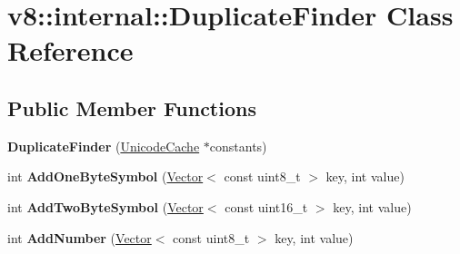 \hypertarget{classv8_1_1internal_1_1_duplicate_finder}{}\section{v8\+:\+:internal\+:\+:Duplicate\+Finder Class Reference}
\label{classv8_1_1internal_1_1_duplicate_finder}
\subsection*{Public Member Functions}
\begin{DoxyCompactItemize}
\item 
{\bfseries Duplicate\+Finder} (\hyperlink{classv8_1_1internal_1_1_unicode_cache}{Unicode\+Cache} $\ast$constants)\hypertarget{classv8_1_1internal_1_1_duplicate_finder_a927b48956e82ff809b782a602987d4e3}{}\label{classv8_1_1internal_1_1_duplicate_finder_a927b48956e82ff809b782a602987d4e3}

\item 
int {\bfseries Add\+One\+Byte\+Symbol} (\hyperlink{classv8_1_1internal_1_1_vector}{Vector}$<$ const uint8\+\_\+t $>$ key, int value)\hypertarget{classv8_1_1internal_1_1_duplicate_finder_a347c1166134c068ac1239f54a452c4fe}{}\label{classv8_1_1internal_1_1_duplicate_finder_a347c1166134c068ac1239f54a452c4fe}

\item 
int {\bfseries Add\+Two\+Byte\+Symbol} (\hyperlink{classv8_1_1internal_1_1_vector}{Vector}$<$ const uint16\+\_\+t $>$ key, int value)\hypertarget{classv8_1_1internal_1_1_duplicate_finder_a1b859971d4bdf0574b7e2b312eb1a764}{}\label{classv8_1_1internal_1_1_duplicate_finder_a1b859971d4bdf0574b7e2b312eb1a764}

\item 
int {\bfseries Add\+Number} (\hyperlink{classv8_1_1internal_1_1_vector}{Vector}$<$ const uint8\+\_\+t $>$ key, int value)\hypertarget{classv8_1_1internal_1_1_duplicate_finder_a0a998fcfa8e1b5bf821110102c7fe2d4}{}\label{classv8_1_1internal_1_1_duplicate_finder_a0a998fcfa8e1b5bf821110102c7fe2d4}

\end{DoxyCompactItemize}
